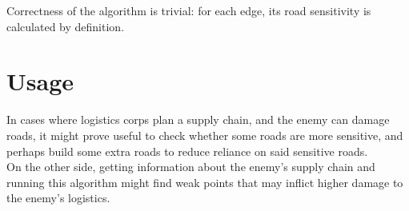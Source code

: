 Correctness of the algorithm is trivial: for each edge, its road sensitivity is calculated by definition.

\section{Usage}
In cases where logistics corps plan a supply chain, and the enemy can damage roads, it might prove useful to check whether some roads are more sensitive, and perhaps build some extra roads to reduce reliance on said sensitive roads.\\

On the other side, getting information about the enemy's supply chain and running this algorithm might find weak points that may inflict higher damage to the enemy's logistics.

